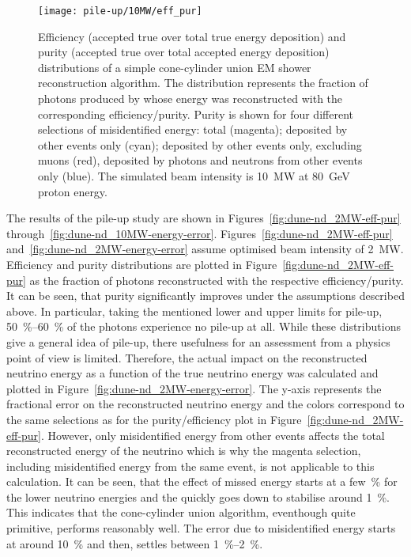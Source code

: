 \begin{figure}[htb]
	\centering
	\texttt{[image: pile-up/10MW/eff\_pur]}
	\caption{Efficiency (accepted true over total true energy deposition) and purity (accepted true over total accepted energy deposition) distributions of a simple cone-cylinder union EM shower reconstruction algorithm.
	The distribution represents the fraction of photons produced by \Pgpz whose energy was reconstructed with the corresponding efficiency/purity.
	Purity is shown for four different selections of misidentified energy: total (magenta); deposited by other events only (cyan); deposited by other events only, excluding muons (red), deposited by photons and neutrons from other events only (blue).
	The simulated beam intensity is \SI{10}{\mega\watt} at \SI{80}{\giga\electronvolt} proton energy.}
	\label{fig:dune-nd_10MW-eff-pur}
\end{figure}

The results of the pile-up study are shown in Figures~\ref{fig:dune-nd_2MW-eff-pur} through~\ref{fig:dune-nd_10MW-energy-error}.
Figures~\ref{fig:dune-nd_2MW-eff-pur} and~\ref{fig:dune-nd_2MW-energy-error} assume optimised beam intensity of \SI{2}{\mega\watt}.
Efficiency and purity distributions are plotted in Figure~\ref{fig:dune-nd_2MW-eff-pur} as the fraction of \Pgpz photons reconstructed with the respective efficiency/purity.
It can be seen, that purity significantly improves under the assumptions described above.
In particular, taking the mentioned lower and upper limits for pile-up, \SIrange{50}{60}{\percent} of the photons experience no pile-up at all.
While these distributions give a general idea of pile-up, there usefulness for an assessment from a physics point of view is limited.
Therefore, the actual impact on the reconstructed neutrino energy as a function of the true neutrino energy was calculated and plotted in Figure~\ref{fig:dune-nd_2MW-energy-error}.
The y-axis represents the fractional error on the reconstructed neutrino energy and the colors correspond to the same selections as for the purity/efficiency plot in Figure~\ref{fig:dune-nd_2MW-eff-pur}.
However, only misidentified energy from other events affects the total reconstructed energy of the neutrino which is why the magenta selection, including misidentified energy from the same event, is not applicable to this calculation.
It can be seen, that the effect of missed energy starts at a few~\si{\percent} for the lower neutrino energies and the quickly goes down to stabilise around \SI{1}{\percent}.
This indicates that the cone-cylinder union algorithm, eventhough quite primitive, performs reasonably well.
The error due to misidentified energy starts at around \SI{10}{\percent} and then, settles between \SIrange{1}{2}{\percent}.

